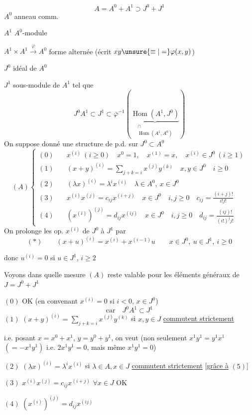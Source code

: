 \[
A=A^0+A^1\supset J^0+J^1
\]
$A^0$ anneau comm.

$A^1$ $A^0$-module

$A^1\times A^1\xrightarrow{\varphi}A^0$ forme alternée (écrit $xy\unsure{\equiv|=}\varphi(x,y)$)

$J^0$ idéal de $A^0$

$J^1$  sous-module de $A^1$ tel que
\[
J^0A^1\subset J^1\subset\overline\varphi^{-1}\left(\underset{\substack{\cap\\\operatorname{Hom}(A^1,A^0)}}{\underbrace{\operatorname{Hom}(A^1,J^0)}}\right)
\]
On suppose donné une structure de p.d. sur $J^0\subset A^0$
\[
(A)\left\{\begin{aligned}
(0)\quad&x^{(i)}\ (i\geq0)\quad x^0=1,\quad x^{(1)}=x,\quad x^{(i)}\in J^0\ (i\geq1)\\
(1)\quad&(x+y)^{(i)}=\sum_{j+k=i}x^{(j)}y^{(k)}\quad x,y\in J^0\quad i\geq0\\
(2)\quad&(\lambda x)^{(i)}=\lambda^i x^{(i)}\quad\lambda\in A^0,\ x\in J^0\\
(3)\quad&x^{(i)}x^{(j)}=c_{ij}x^{(i+j)}\quad x\in J^0\quad i,j\geq0\quad c_{ij}=\frac{(i+j)!}{i!j!}\\
(4)\quad&(x^{(i)})^{(j)}=d_{ij}x^{(ij)}\quad x\in J^0\quad i,j\geq0\quad d_{ij}=\frac{(ij)!}{(i!)^j j!}
\end{aligned}\right.
\]
On prolonge les op. $x^{(i)}$ de $J^0$ à  $J^1$ par
\[
(*)\qquad(x+u)^{(i)}=x^{(i)}+x^{(i-1)}u\qquad x\in J^0,\ u\in J^1,\ i\geq0
\]

donc $u^{(i)}=0$ si $u\in J^1$, $i\geq2$

Voyons dans quelle mesure $(A)$ reste valable pour les éléments généraux de $J=J^0+J^1$

$(0)$ OK (en convenant $x^{(i)}=0$ si $i<0$, $x\in J^0$)
\[
\text{car}\quad J^0A^1\subset J^1
\]
$(1)$ $(x+y)^{(i)}=\sum_{j+k=i}x^{(j)}y^{(k)}$ si $x,y\in J$ \uline{commutent strictement}


i.e. posant $x=x^0+x^1$, $y=y^0+y^1$, on veut (non seulement $x^1y^1=y^1x^1$  $(=-x^1y^1)$ i.e. $2x^1y^1=0$, mais même $x^1y^1=0$)

$(2)$ $(\lambda x)^{(i)}=\lambda^i x^{(i)}$ si $\lambda\in A,x\in J$ \uline{commutent strictement} [\uline{grâce à} $(5)$]

$(3)$  $x^{(i)}x^{(j)}=c_{ij}x^{(i+j)}$ \hfill $\forall x\in J$ OK

$(4)$ $(x^{(i)})^{(j)}=d_{ij}x^{(ij)}$
